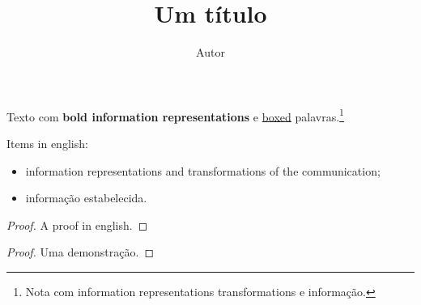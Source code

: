 \documentclass{article}
\title{Um título}
\author{Autor}
\begin{document}
\maketitle
Texto com \textbf{\foreignlanguage{english}{bold information representations}} e \underline{\foreignlanguage{english}{boxed}} palavras.\footnote{Nota com \foreignlanguage{english}{information representations transformations} e informação.}

\begin{otherlanguage}{english}
Items in english:
\begin{itemize}
\item information representations and transformations of the communication;
\item \foreignlanguage{portuguese}{informação estabelecida}.
\end{itemize}
\begin{proof}
A proof in english.
\end{proof}
\end{otherlanguage}
\begin{proof}
Uma demonstração.
\end{proof}
\end{document}
